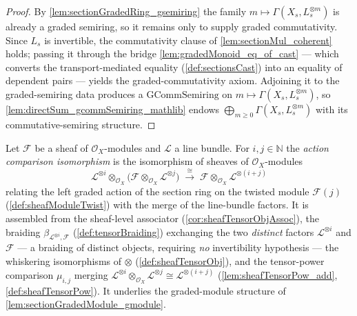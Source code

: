 \begin{proof}
    \leanok
  By \cref{lem:sectionGradedRing_gsemiring} the family
  \(m \mapsto \Gamma(X_s, L_s^{\otimes m})\) is already a graded semiring, so it
  remains only to supply graded commutativity. Since \(L_s\) is invertible, the
  commutativity clause of \cref{lem:sectionMul_coherent} holds; passing it through
  the bridge \cref{lem:gradedMonoid_eq_of_cast} --- which converts the
  transport-mediated equality (\cref{def:sectionsCast}) into an equality of
  dependent pairs --- yields the graded-commutativity axiom. Adjoining it to the
  graded-semiring data produces a \(\mathrm{GCommSemiring}\) on
  \(m \mapsto \Gamma(X_s, L_s^{\otimes m})\), so
  \cref{lem:directSum_gcommSemiring_mathlib} endows
  \(\bigoplus_{m \ge 0} \Gamma(X_s, L_s^{\otimes m})\) with its commutative-semiring
  structure.
\end{proof}

\begin{definition}\leanok
  \label{def:moduleTensorPowAdd}
  Let \(\mathcal{F}\) be a sheaf of \(\mathcal{O}_X\)-modules and \(\mathcal{L}\) a
  line bundle. For \(i, j \in \mathbb{N}\) the \emph{action comparison
  isomorphism} is the isomorphism of sheaves of \(\mathcal{O}_X\)-modules
  \[
    \mathcal{L}^{\otimes i} \otimes_{\mathcal{O}_X}
      \bigl(\mathcal{F} \otimes_{\mathcal{O}_X} \mathcal{L}^{\otimes j}\bigr)
    \;\xrightarrow{\ \cong\ }\;
    \mathcal{F} \otimes_{\mathcal{O}_X} \mathcal{L}^{\otimes (i+j)}
  \]
  relating the left graded action of the section ring on the twisted module
  \(\mathcal{F}(j)\) (\cref{def:sheafModuleTwist}) with the merge of the
  line-bundle factors. It is assembled from the sheaf-level associator
  (\cref{cor:sheafTensorObjAssoc}), the braiding
  \(\beta_{\mathcal{L}^{\otimes i},\mathcal{F}}\) (\cref{def:tensorBraiding})
  exchanging the two \emph{distinct} factors \(\mathcal{L}^{\otimes i}\) and
  \(\mathcal{F}\) --- a braiding of distinct objects, requiring \emph{no}
  invertibility hypothesis --- the whiskering isomorphisms of \(\otimes\)
  (\cref{def:sheafTensorObj}), and the tensor-power comparison \(\mu_{i,j}\)
  merging \(\mathcal{L}^{\otimes i} \otimes_{\mathcal{O}_X} \mathcal{L}^{\otimes j}
  \cong \mathcal{L}^{\otimes (i+j)}\) (\cref{lem:sheafTensorPow_add},
  \cref{def:sheafTensorPow}). It underlies the graded-module
  structure of \cref{lem:sectionGradedModule_gmodule}.
\end{definition}

